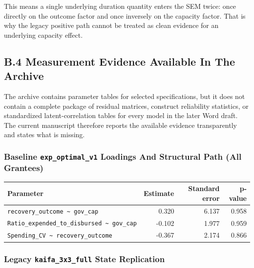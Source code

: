 \documentclass[
  letterpaper,
]{article}
\begin{document}
This means a single underlying duration quantity enters the SEM twice:
once directly on the outcome factor and once inversely on the capacity
factor. That is why the legacy positive path cannot be treated as clean
evidence for an underlying capacity effect.

\subsection{B.4 Measurement Evidence Available In The
Archive}\label{b.4-measurement-evidence-available-in-the-archive}

The archive contains parameter tables for selected specifications, but
it does not contain a complete package of residual matrices, construct
reliability statistics, or standardized latent-correlation tables for
every model in the later Word draft. The current manuscript therefore
reports the available evidence transparently and states what is missing.

\subsubsection{\texorpdfstring{Baseline \texttt{exp\_optimal\_v1}
Loadings And Structural Path (All
Grantees)}{Baseline exp\_optimal\_v1 Loadings And Structural Path (All Grantees)}}\label{baseline-exp_optimal_v1-loadings-and-structural-path-all-grantees}

\begin{longtable}[]{@{}lrrr@{}}
\toprule\noalign{}
Parameter & Estimate & Standard error & p-value \\
\midrule\noalign{}
\endhead
\bottomrule\noalign{}
\endlastfoot
\texttt{recovery\_outcome\ \textasciitilde{}\ gov\_cap} & 0.320 & 6.137
& 0.958 \\
\texttt{Ratio\_expended\_to\_disbursed\ \textasciitilde{}\ gov\_cap} &
-0.102 & 1.977 & 0.959 \\
\texttt{Spending\_CV\ \textasciitilde{}\ recovery\_outcome} & -0.367 &
2.174 & 0.866 \\
\end{longtable}

\subsubsection{\texorpdfstring{Legacy \texttt{kaifa\_3x3\_full} State
Replication}{Legacy kaifa\_3x3\_full State Replication}}\label{legacy-kaifa_3x3_full-state-replication}
\end{document}
